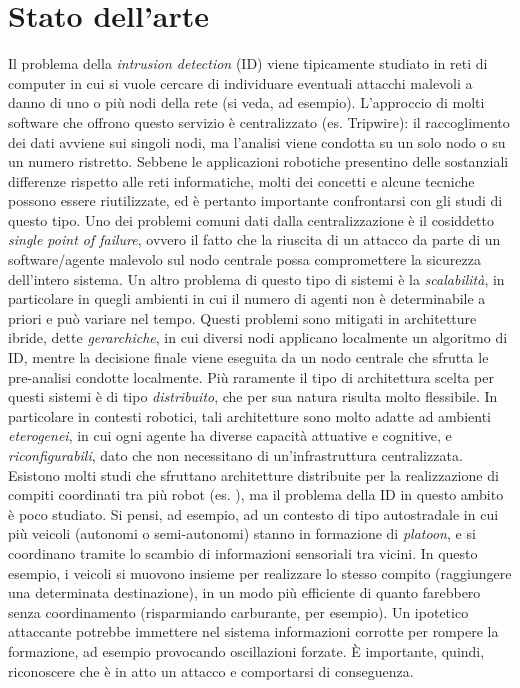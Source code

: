 \documentclass[paper=a4, fontsize=11pt]{scrartcl} %
\numberwithin{equation}{section} %
\numberwithin{figure}{section} %
\numberwithin{table}{section} %
\begin{document}
\section{Stato dell'arte}
Il problema della \textit{intrusion detection} (ID) viene tipicamente studiato in reti di computer in cui si vuole cercare di individuare eventuali attacchi malevoli 
a danno di uno o più nodi della rete (si veda, ad esempio). L'approccio di molti software che offrono questo servizio è centralizzato (es. Tripwire): il raccoglimento dei dati avviene sui singoli nodi, ma l'analisi viene condotta su un solo nodo o su un numero ristretto. Sebbene le applicazioni robotiche presentino delle sostanziali differenze rispetto alle reti informatiche, molti dei concetti e alcune tecniche possono essere riutilizzate, ed è pertanto importante confrontarsi con gli studi di questo tipo. Uno dei problemi comuni dati dalla centralizzazione è il cosiddetto \textit{single point of failure}, ovvero il
fatto che la riuscita di un attacco da parte di un software/agente malevolo sul nodo centrale possa compromettere la sicurezza dell'intero sistema. 
Un altro problema di questo tipo di sistemi è la \textit{scalabilità}, in particolare in quegli ambienti in cui il numero di 
agenti non è determinabile a priori e può variare nel tempo. Questi problemi sono mitigati in architetture ibride,
dette \textit{gerarchiche}\cite{HierarchicalIDS}, in cui diversi nodi applicano localmente un algoritmo di ID, mentre la decisione finale viene eseguita da un nodo centrale che sfrutta le pre-analisi
condotte localmente. Più raramente il tipo di architettura scelta per questi sistemi è di tipo \textit{distribuito}, che per sua natura risulta molto flessibile. In particolare in contesti robotici, tali architetture sono molto adatte ad ambienti \textit{eterogenei}, in cui ogni agente ha diverse capacità attuative e cognitive, e \textit{riconfigurabili}\cite{ram10-bfp},
dato che non necessitano di un'infrastruttura centralizzata. Esistono molti studi che sfruttano architetture distribuite per la realizzazione di compiti coordinati tra più robot (es. \cite{coordination1}), ma il problema della ID in questo ambito è poco studiato. Si pensi, ad esempio, ad un contesto di tipo autostradale in cui 
più veicoli (autonomi o semi-autonomi) stanno in formazione di \textit{platoon}, e si coordinano tramite lo scambio di informazioni sensoriali tra vicini\cite{platoon1}. In questo esempio, i veicoli si 
muovono insieme per realizzare lo stesso compito (raggiungere una determinata destinazione), in un modo più efficiente di quanto farebbero
senza coordinamento (risparmiando carburante, per esempio). Un ipotetico 
attaccante potrebbe immettere nel sistema informazioni corrotte per rompere la formazione, ad esempio provocando oscillazioni forzate. \`E importante, quindi, riconoscere che è in atto un attacco e comportarsi 
di conseguenza. 
\end{document}
